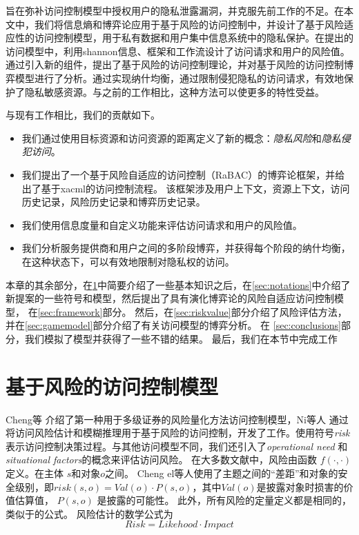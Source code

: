 旨在弥补访问控制模型中授权用户的隐私泄露漏洞，并克服先前工作的不足。在本文中，我们将信息熵和博弈论应用于基于风险的访问控制中，并设计了基于风险适应性的访问控制模型，用于私有数据和用户集中信息系统中的隐私保护。在提出的访问模型中，利用shannon信息、框架和工作流设计了访问请求和用户的风险值。通过引入新的组件，提出了基于风险的访问控制理论，并对基于风险的访问控制博弈模型进行了分析。通过实现纳什均衡，通过限制侵犯隐私的访问请求，有效地保护了隐私敏感资源。与之前的工作相比，这种方法可以使更多的特性受益。


与现有工作相比，我们的贡献如下。
\begin{itemize}
	
	\item 我们通过使用目标资源和访问资源的距离定义了新的概念：\textit{隐私风险}和\textit{隐私侵犯访问}。
	\item 我们提出了一个基于风险自适应的访问控制（RaBAC）的博弈论框架，并给出了基于xacml的访问控制流程。
	该框架涉及用户上下文，资源上下文，访问历史记录，风险历史记录和博弈历史记录。
	\item 我们使用信息度量和自定义功能来评估访问请求和用户的风险值。
	\item 我们分析服务提供商和用户之间的多阶段博弈，并获得每个阶段的纳什均衡，在这种状态下，可以有效地限制对隐私权的访问。
\end{itemize}


本章的其余部分，在\ref{sec:preliminaries}中简要介绍了一些基本知识之后，在\ref{sec:notations}中介绍了新提案的一些符号和模型，然后提出了具有演化博弈论的风险自适应访问控制模型， 在\ref{sec:framework}部分。 然后，在\ref{sec:riskvalue}部分介绍了风险评估方法，并在\ref{sec:gamemodel}部分介绍了有关访问模型的博弈分析。 在 \ref{sec:conclusions}部分，我们模拟了模型并获得了一些不错的结果。
最后，我们在本节中完成工作

\section{基于风险的访问控制模型}
\label{sec:preliminaries}

Cheng等\cite{cheng2007fuzzy} 介绍了第一种用于多级证券的风险量化方法访问控制模型，Ni等人\cite{ni2010risk} 通过将访问风险估计和模糊推理用于基于风险的访问控制，开发了工作\cite{cheng2007fuzzy}。使用符号\emph{risk}表示访问控制决策过程。与其他访问模型不同，我们还引入了\emph{operational need} 和\emph{situational factors}的概念来评估访问风险。 在大多数文献\cite{cheng2007fuzzy,ni2010risk,kandala2011,bijon2012}中，风险由函数 $f(\cdot, \cdot)$定义。在主体 $s$和对象$o$之间。 Cheng el等人\cite{cheng2007fuzzy}使用了主题之间的“差距”和对象的安全级别，即$risk(s,o)=Val(o) \cdot P(s,o)$，其中$Val(o)$是披露对象时损害的价值估算值， $P(s,o)$ 是披露的可能性。 此外，所有风险的定量定义都是相同的，类似于\cite{cheng2007fuzzy}的公式。 风险估计的数学公式为
\begin{equation}\label{eq:naive_risk}
Risk = Likehood \cdot Impact
\end{equation}

